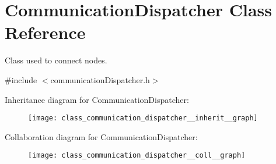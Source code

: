 \hypertarget{class_communication_dispatcher}{}\section{Communication\+Dispatcher Class Reference}
\label{class_communication_dispatcher}


Class used to connect nodes.  




{\ttfamily \#include $<$communication\+Dispatcher.\+h$>$}



Inheritance diagram for Communication\+Dispatcher\+:
\nopagebreak
\begin{figure}[H]
\begin{center}
\leavevmode
\texttt{[image: class\_communication\_dispatcher\_\_inherit\_\_graph]}
\end{center}
\end{figure}


Collaboration diagram for Communication\+Dispatcher\+:
\nopagebreak
\begin{figure}[H]
\begin{center}
\leavevmode
\texttt{[image: class\_communication\_dispatcher\_\_coll\_\_graph]}
\end{center}
\end{figure}
